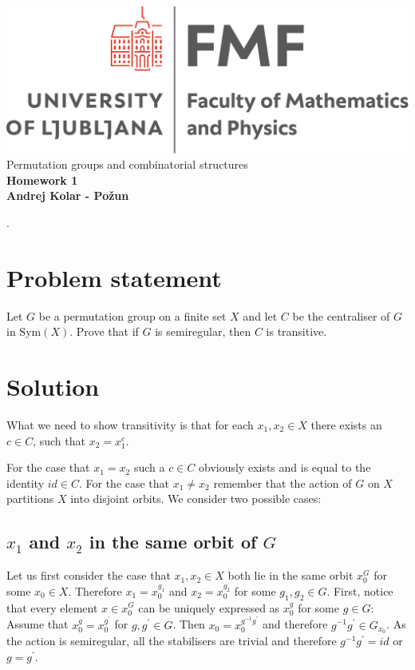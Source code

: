\documentclass{article}
\begin{document}
\begin{titlepage}
    \begin{center}
        \vspace*{1cm}
        \Large
\includegraphics[width=.8\linewidth]{slike/fmflogo.pdf}\\
        \Large
\vspace{3cm}
        Permutation groups and combinatorial structures\\
        \huge
        \textbf{Homework 1\\}
\Large  
        \vspace{1cm}
        \textbf{Andrej Kolar - Po{\v z}un\\}


\vfill
\normalsize
\end{center}. 
\end{titlepage}
\newpage
{}
\section*{Problem statement}
Let $G$ be a permutation group on a finite set $X$ and let $C$ be the centraliser of $G$ in $\mathrm{Sym}\left(X\right)$. Prove that if $G$ is semiregular, then $C$ is transitive.
\section*{Solution}
What we need to show transitivity is that for each $x_1, x_2 \in X$ there exists an $c \in C$, such that $x_2 = x_1^c$.

For the case that $x_1 = x_2$ such a $c \in C$ obviously exists and is equal to the identity $id \in C$.
For the case that $x_1 \neq x_2$ remember that the action of $G$ on $X$ partitions $X$ into disjoint orbits. We consider two possible cases:
\subsection*{$x_1$ and $x_2$ in the same orbit of $G$}
Let us first consider the case that $x_1 , x_2 \in X$ both lie in the same orbit $x_0^G$ for some $x_0 \in X$. Therefore $x_1 = x_0^{g_1}$ and $x_2 = x_0^{g_2}$ for some $g_1,g_2 \in G$. First, notice that every element $x \in x_0^G$ can be uniquely expressed as $x_0^g$ for some $g \in G$: Assume that $x_0^g = x_0^{g^\prime}$ for $g, g^\prime \in G$. Then $x_0 = x_0^{g^{-1} g^\prime}$ and therefore $g^{-1} g^\prime \in G_{x_0}$. As the action is semiregular, all the stabilisers are trivial and therefore $g^{-1} g^\prime = id$ or $g=g^\prime$.
\\
\end{document}
